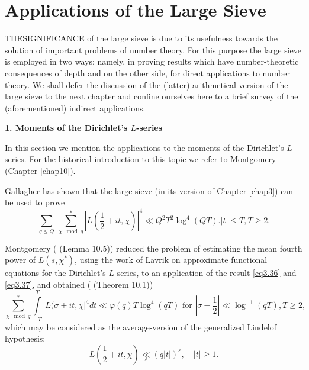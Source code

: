

\chapter{Applications of the Large Sieve}\label{chap6}%

THE\pageoriginale SIGNIFICANCE of the large sieve is due to its
usefulness towards 
the solution of important problems of number theory. For this purpose
the large sieve is employed in two ways; namely, in proving results
which have number-theoretic consequences of depth and on the other
side, for direct applications to number theory. We shall defer the
discussion of the (latter) arithmetical version of the large sieve to
the next chapter and confine ourselves here to a brief survey of the
(aforementioned) indirect applications. 


\medskip
\noindent
{\bf 1. Moments of the Dirichlet's {\boldmath$L$}-series}
\smallskip 

In this section we mention the applications to the moments of the
Dirichlet's $L$-series. For the historical introduction to this topic we
refer to Montgomery \cite{key5} (Chapter \ref{chap10}). 

Gallagher \cite{key1} has shown that the large sieve (in its version of
Chapter \ref{chap3}) can be used to prove 
\begin{equation*}
\sum_{q \leq Q} ~ \sum_{\chi\mod  q}^* | L(\frac{1}{2}+it,\chi) |^4
\ll Q^2 T^2 \log^4 (QT). |t|\leq T, T \geq 2. \tag{6.1}\label{eq6.1} 
\end{equation*}

Montgomery (\cite{key5} (Lemma 10.5)) reduced the problem of
estimating the mean fourth power of $L(s,\chi^*)$, using the work of
Lavrik on approximate functional equations for the Dirichlet's
$L$-series, to an application of the result \eqref{eq3.36} and
\eqref{eq3.37}, and obtained (\cite{key5} (Theorem 10.1))
{\fontsize{10pt}{12pt}\selectfont
\begin{equation*}
\sum_{\chi \mod q}^* \int\limits_{-T}^{T} | L(\sigma + it, \chi
|^4 dt \ll\varphi (q) T \log^4 (qT) \text{ for } | \sigma -
\frac{1}{2} | \ll \log^{-1} (qT), T\geq 2, \tag{6.2}\label{eq6.2} 
\end{equation*}}\relax
which may be considered as the average-version of the generalized
Lindelof hypothesis: 
\begin{equation*}
L(\frac{1}{2} + it,\chi ) \underset{\varepsilon}{\ll}
(q|t|)^\varepsilon , \quad |t|\geq 1. \tag{6.3}\label{eq6.3} 
\end{equation*}

